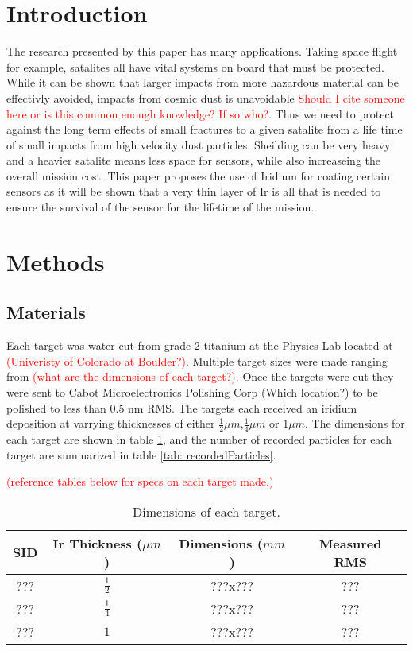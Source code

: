 \documentclass[review]{elsarticle}
\begin{document}
	\section{Introduction}
		The research presented by this paper has many applications. Taking space flight for example, satalites all have vital systems
		on board that must be protected. While it can be shown that larger impacts from more hazardous material can be effectivly
		avoided, impacts from cosmic dust is unavoidable \textcolor{red}{Should I cite someone here or is this common enough knowledge?
		 If so who?}. Thus we need to protect against the long term effects of small fractures to 
		a given satalite from a life time of small impacts from high velocity dust particles. Sheilding can be very heavy and a heavier
		satalite means less space for sensors, while also increaseing the overall mission cost. This paper proposes the use of Iridium
		for coating certain sensors as it will be shown that a very thin layer of Ir is all that is needed to ensure the survival of
		the sensor for the lifetime of the mission.

	\section{Methods}
		\subsection{Materials}	
		Each target was water cut from grade 2 titanium at the Physics Lab located at \textcolor{red}{(Univeristy of Colorado at 
		Boulder?)}. Multiple target sizes were made ranging from \textcolor{red}{(what are the dimensions of each target?)}. 
		Once the targets were cut they were sent to Cabot Microelectronics Polishing Corp (Which location?) to be polished to less
		than 0.5 nm RMS. The targets each received an iridium deposition at varrying thicknesses of either 
		$\frac{1}{2}\mu m$,$\frac{1}{4}\mu m$ or $1\mu m $. The dimensions for each target are shown in table \ref{tab: targetDims}, and
		the number of recorded particles for each target are summarized in table \ref{tab: recordedParticles}.
		
		\textcolor{red}{(reference tables below for specs on each target made.)}
		\begin{table}
			\begin{center}
				\begin{tabular}{c|c|c|c} 
				SID & Ir Thickness ($\mu m$) & Dimensions ($mm$) & Measured RMS \\ 
				\hline 
				??? & $\frac{1}{2}$		 & ???x???			     & ???\\
				\hline
				??? & $\frac{1}{4}$		 & ???x???			     & ???\\
				\hline
				??? & $1$		 		 & ???x???			     & ???\\
						
				\end{tabular}
			\end{center}
		\caption
		{
			\label{tab: targetDims}
			Dimensions of each target.
		}
		\end{table}
\end{document}

